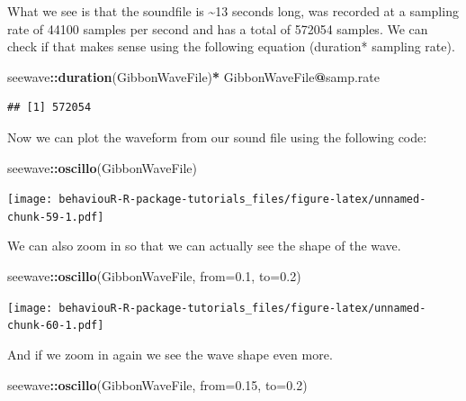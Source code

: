 \documentclass[]{book}
\newenvironment{Shaded}{\begin{snugshade}}{\end{snugshade}}
\newcommand{\DataTypeTok}[1]{\textcolor[rgb]{0.13,0.29,0.53}{#1}}
\newcommand{\FloatTok}[1]{\textcolor[rgb]{0.00,0.00,0.81}{#1}}
\newcommand{\KeywordTok}[1]{\textcolor[rgb]{0.13,0.29,0.53}{\textbf{#1}}}
\newcommand{\NormalTok}[1]{#1}
\newcommand{\OperatorTok}[1]{\textcolor[rgb]{0.81,0.36,0.00}{\textbf{#1}}}
\newcommand{\StringTok}[1]{\textcolor[rgb]{0.31,0.60,0.02}{#1}}
\begin{document}
What we see is that the soundfile is \textasciitilde{}13 seconds long, was recorded at a sampling rate of 44100 samples per second and has a total of 572054 samples. We can check if that makes sense using the following equation (duration* sampling rate).

\begin{Shaded}
\begin{Highlighting}[]
\NormalTok{seewave}\OperatorTok{::}\KeywordTok{duration}\NormalTok{(GibbonWaveFile)}\OperatorTok{*}\StringTok{ }\NormalTok{GibbonWaveFile}\OperatorTok{@}\NormalTok{samp.rate}
\end{Highlighting}
\end{Shaded}

\begin{verbatim}
## [1] 572054
\end{verbatim}

Now we can plot the waveform from our sound file using the following code:

\begin{Shaded}
\begin{Highlighting}[]
\NormalTok{seewave}\OperatorTok{::}\KeywordTok{oscillo}\NormalTok{(GibbonWaveFile)}
\end{Highlighting}
\end{Shaded}

\texttt{[image: behaviouR-R-package-tutorials\_files/figure-latex/unnamed-chunk-59-1.pdf]}

We can also zoom in so that we can actually see the shape of the wave.

\begin{Shaded}
\begin{Highlighting}[]
\NormalTok{seewave}\OperatorTok{::}\KeywordTok{oscillo}\NormalTok{(GibbonWaveFile, }\DataTypeTok{from=}\FloatTok{0.1}\NormalTok{, }\DataTypeTok{to=}\FloatTok{0.2}\NormalTok{)}
\end{Highlighting}
\end{Shaded}

\texttt{[image: behaviouR-R-package-tutorials\_files/figure-latex/unnamed-chunk-60-1.pdf]}

And if we zoom in again we see the wave shape even more.

\begin{Shaded}
\begin{Highlighting}[]
\NormalTok{seewave}\OperatorTok{::}\KeywordTok{oscillo}\NormalTok{(GibbonWaveFile, }\DataTypeTok{from=}\FloatTok{0.15}\NormalTok{, }\DataTypeTok{to=}\FloatTok{0.2}\NormalTok{)}
\end{Highlighting}
\end{Shaded}
\end{document}
